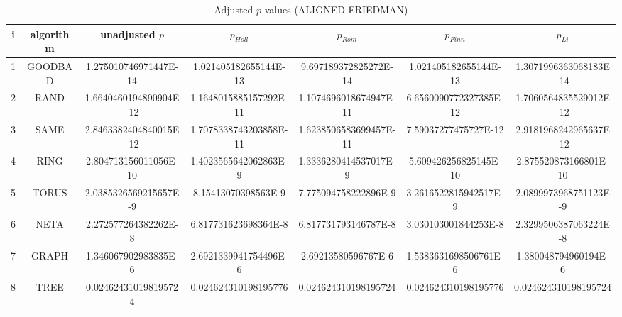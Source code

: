 \documentclass[a4paper,10pt]{article}
\begin{document}
\begin{landscape}
\begin{table}[!htp]
\centering\scriptsize
\caption{Adjusted $p$-values (ALIGNED FRIEDMAN)}
\begin{tabular}{ccccccc}
i&algorithm&unadjusted $p$&$p_{Holl}$&$p_{Rom}$&$p_{Finn}$&$p_{Li}$\\
\hline
1& GOODBAD&1.275010746971447E-14&1.021405182655144E-13&9.697189372825272E-14&1.021405182655144E-13&1.3071996363068183E-14\\
2& RAND&1.6640460194890904E-12&1.1648015885157292E-11&1.1074696018674947E-11&6.6560090772327385E-12&1.7060564835529012E-12\\
3& SAME&2.8463382404840015E-12&1.7078338743203858E-11&1.6238506583699457E-11&7.59037277475727E-12&2.9181968242965637E-12\\
4& RING&2.804713156011056E-10&1.4023565642062863E-9&1.3336280414537017E-9&5.609426256825145E-10&2.875520873166801E-10\\
5& TORUS&2.0385326569215657E-9&8.15413070398563E-9&7.775094758222896E-9&3.2616522815942517E-9&2.0899973968751123E-9\\
6& NETA&2.272577264382262E-8&6.817731623698364E-8&6.817731793146787E-8&3.030103001844253E-8&2.3299506387063224E-8\\
7& GRAPH&1.346067902983835E-6&2.6921339941754496E-6&2.69213580596767E-6&1.5383631698506761E-6&1.380048794960194E-6\\
8& TREE&0.024624310198195724&0.024624310198195776&0.024624310198195724&0.024624310198195776&0.024624310198195724\\
\hline
\end{tabular}
\end{table}


\newpage


\end{landscape}
\end{document}
